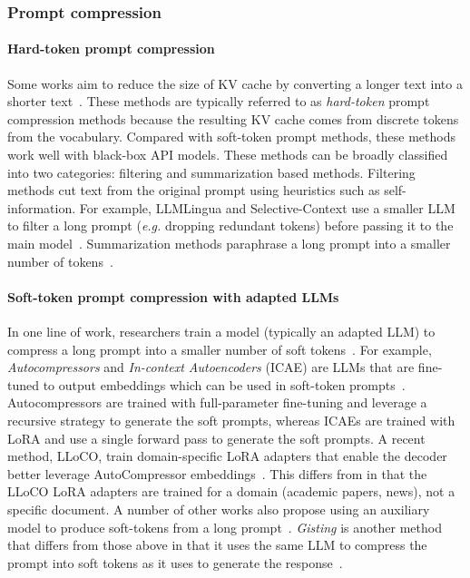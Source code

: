 \subsubsection{Prompt compression}
\label{app:related-work-reducekv-prompt}
\paragraph{Hard-token prompt compression}
Some works aim to reduce the size of KV cache by converting a longer text into a shorter text~\cite{jiang2023llmlingua,li2023unlocking,chuang2024learning,zhang2024adacomp,pan2024llmlingua}. These methods are typically referred to as \textit{hard-token} prompt compression methods because the resulting KV cache comes from discrete tokens from the vocabulary. Compared with soft-token prompt methods, these methods work well with black-box API models.
These methods can be broadly classified into two categories: filtering and summarization based methods.
Filtering methods cut text from the original prompt using heuristics such as self-information. For example, LLMLingua and Selective-Context use a smaller LLM to filter a long prompt (\textit{e.g.} dropping redundant tokens) before passing it to the main model~\cite{jiang2023llmlingua,li2023unlocking}.
Summarization methods paraphrase a long prompt into a smaller number of tokens~\cite{chuang2024learning}.
\paragraph{Soft-token prompt compression with adapted LLMs}
In one line of work, researchers train a model (typically an adapted LLM) to compress a long prompt into a smaller number of soft tokens~\cite{chevalier2023adapting,yen2024long,ge2023context,mu2023learning,qin2023dodo}.
For example, \textit{Autocompressors} and \textit{In-context Autoencoders} (ICAE) are LLMs that are fine-tuned to output embeddings which can be used in soft-token prompts~\cite{chevalier2023adapting,ge2023context}. Autocompressors are trained with full-parameter fine-tuning and leverage a recursive strategy to generate the soft prompts, whereas ICAEs are trained with LoRA and use a single forward pass to generate the soft prompts.
A recent method, LLoCO, train domain-specific LoRA adapters that enable the decoder better leverage AutoCompressor embeddings~\cite{tan2024lloco}. This differs from \artifacts in that the LLoCO LoRA adapters are trained for a domain (\eg academic papers, news), not a specific document.
A number of other works also propose using an auxiliary model to produce soft-tokens from a long prompt~\cite{ge2023context,qin2023dodo}.
\textit{Gisting} is another method that differs from those above in that it uses the same LLM to compress the prompt into soft tokens as it uses to generate the response~\cite{mu2023learning}.
